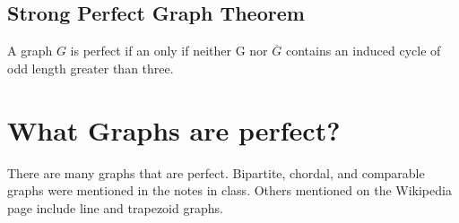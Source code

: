 \subsection{Strong Perfect Graph Theorem}
\begin{paragraph}
\indent A graph $G$ is perfect if an only if neither G nor $\overline{G}$ contains an induced cycle of odd length greater than three.
\end{paragraph}

\section{What Graphs are perfect?}
\begin{paragraph}
\indent There are many graphs that are perfect. Bipartite, chordal, and comparable graphs were mentioned in the notes in class. Others mentioned on the Wikipedia page include line and trapezoid graphs.
\end{paragraph}



\nocite{*}


